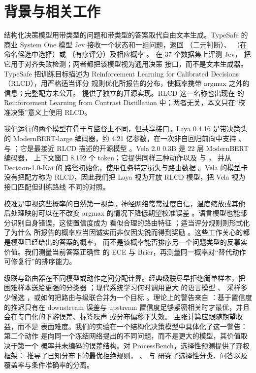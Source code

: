 \section{背景与相关工作}

结构化决策模型用带类型的问题和带类型的答案取代自由文本生成。TypeSafe 的
商业 System One 模型 Jev 接收一个状态和一组问题，返回 \noul{}（二元判断）、
\choice{}（在命名候选中选择）或 \score{}（有序评分）及相应概率
\citep{typesafe2026}。\citet{deusser2026jev} 在 37 个数据集上评测 Jev，
\citet{guo2026justask} 把它用于对齐失败检测；两者都把该模型视为通用决策
接口，而不是文本生成器。TypeSafe 把训练目标描述为
Reinforcement Learning for Calibrated Decisions（RLCD），用严格适当评分
规则优化所报告的分布，使概率携带 argmax 之外的信息；完整配方未公开。
\citet{gao2026openjev} 提供了独立的开源实现。RLCD 这一名称也出现在
\citet{yang2023rlcd} 的 Reinforcement Learning from Contrast Distillation
中；两者无关，本文只在“校准决策”意义上使用 RLCD。

我们运行的两个模型在骨干与监督上不同，但共享接口。Laya 0.4.16 是带决策头
的 ModernBERT\allowbreak-large 编码器，约 4.21 亿参数，在一次非自回归前向中支持
\noul{}、\choice{} 与 \score{}；它是最接近 RLCD 描述的开源模型
\citep{laya2026,layastudio2026}。Vela 2.0 0.3B 是 22 层 ModernBERT 编码器，
上下文窗口 8{,}192 个 token；它提供同样三种动作以及 \spanact{} 与 \setact{}，
并从 Decision-1.0-Kai 的 \choice{} 路径初始化，使用任务特定损失与路由数据
\citep{vllm2026vela,warner2024modernbert}。Vela 的模型卡没有把配方称为
RLCD，因此我们把 Laya 视为开放 RLCD 模型，把 Vela 视为接口匹配但训练路线
不同的对照。

校准是审视这些概率的自然第一视角。神经网络常常过度自信，温度缩放或其他
后处理映射可以在不改变 argmax 的情况下降低期望校准误差
\citep{guo2017calibration}。语言模型也能部分识别自身错误，这使置信度成为
看似合理的路由特征 \citep{kadavath2022know}；适当评分规则则形式化了为什么
所报告的概率应当因诚实而非仅因尖锐而得到奖励
\citep{gneiting2007scoring}。这些工作关心的都是模型已经给出的答案的概率，
而不是该概率能否排序另一个问题类型的反事实价值。我们测量当前答案正确性
的 ECE 与 Brier，再测量同一概率对“替代动作可修复行”的排序能力。

级联与路由器在不同模型或动作之间分配计算。经典级联尽早拒绝简单样本，把
困难样本送给更强的分类器 \citep{viola2001rapid}；现代系统学习何时调用更大
的语言模型 \citep{chen2024frugalgpt,aggarwal2024automix,ong2024routellm}、
采样多少候选 \citep{ding2025bestroute}，或如何把路由与级联合并为一个目标
\citep{dekoninck2025unified}。理论上的警告来自
\citet{jitkrittum2023cascade}：基于置信度的推迟只有在 downstream 误差与
upstream 置信度足够紧密相关时才最优，并且会在专门化的下游误差、标签噪声
或分布偏移下失效。\citet{damani2025hard} 主张计算应跟随期望收益，而不是
表面难度。我们的实验在一个结构化决策模型中具体化了这一警告：第二个动作
是向同一个冻结网络提出的不同问题，而不是更大的模型，其价值取决于第一个
概率并未编码的误差结构。对 ProcessBench，选择性预测提供了弃权框架：
\citet{chow1970optimum} 推导了已知分布下的最优拒绝规则，
\citet{geifman2017selective}、\citet{kamath2020selective} 与
\citet{xin2021art} 研究了选择性分类、问答以及覆盖率与条件准确率的分离。

